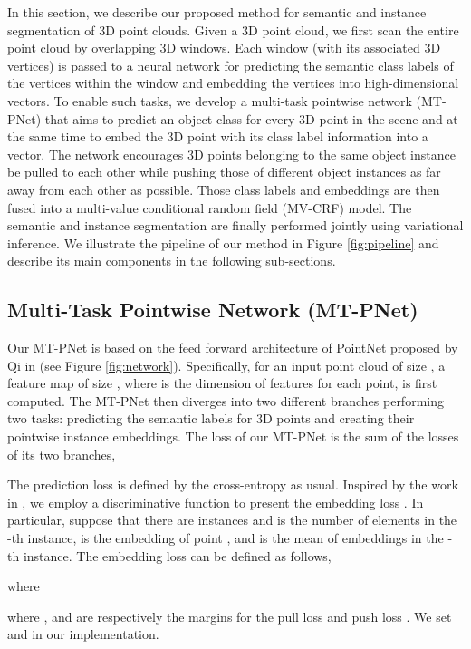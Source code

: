 \documentclass[10pt,twocolumn,letterpaper]{article}
\begin{document}
In this section, we describe our proposed method for semantic and instance
segmentation of 3D point clouds. Given a 3D point cloud, we first scan the
entire point cloud by overlapping 3D windows. Each window (with its associated
3D vertices) is passed to a neural network for predicting the semantic class
labels of the vertices within the window and embedding the vertices into
high-dimensional vectors. To enable such tasks, we develop a multi-task
pointwise network (MT-PNet) that aims to predict an object class for every 3D
point in the scene and at the same time to embed the 3D point with its class
label information into a vector. The network encourages 3D points belonging to
the same object instance be pulled to each other while pushing those of
different object instances as far away from each other as possible. Those class
labels and embeddings are then fused into a multi-value conditional random field
(MV-CRF) model. The semantic and instance segmentation are finally performed
jointly using variational inference. We illustrate the pipeline of our method in
Figure \ref{fig:pipeline} and describe its main components in the following
sub-sections.

\subsection{Multi-Task Pointwise Network (MT-PNet)}
Our MT-PNet is based on the feed forward architecture of PointNet proposed by Qi
\etal in \cite{qi-pointnet-cvpr17} (see Figure \ref{fig:network}). Specifically,
for an input point cloud of size , a feature map of size , where
 is the dimension of features for each point, is first computed. The MT-PNet
then diverges into two different branches performing two tasks: predicting the
semantic labels for 3D points and creating their pointwise instance
embeddings. The loss of our MT-PNet is the sum of the losses of its two
branches,


The prediction loss  is defined by the cross-entropy
as usual. Inspired by the work in \cite{de-discriminative-arxiv17}, we employ a
discriminative function to present the embedding loss .
In particular, suppose that there are  instances and 
is the number of elements in the -th instance,
 is the embedding of point , and
 is the mean of embeddings in the -th instance. The
embedding loss can be defined as follows,

where



where ,  and  are respectively the margins
for the pull loss  and push loss . We
set  and  in our implementation.
\end{document}
